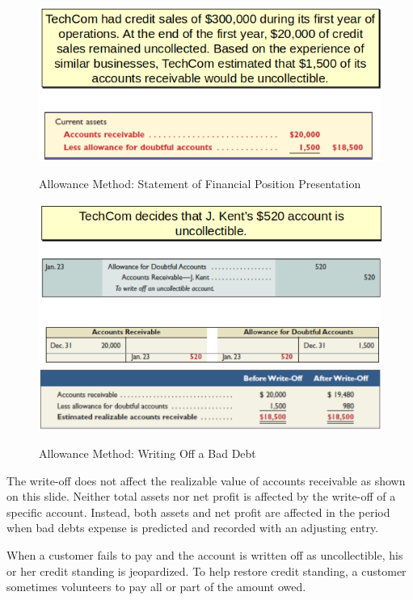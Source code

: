 \documentclass[../main.tex]{subfiles}
\begin{document}
	\begin{figure}[ht]
		\centering
		\includegraphics[width=\columnwidth]{images/c6/allowance_sfp.png}
		\caption{Allowance Method: Statement of Financial Position Presentation}
		\includegraphics[width=\columnwidth]{images/c6/allowance_writeoff.png}
		\includegraphics[width=\columnwidth]{images/c6/allowance_writeoff_result.png}
		\caption{Allowance Method: Writing Off a Bad Debt}
	\end{figure}
	
	The write-off does not affect the realizable value of accounts receivable 
	as shown on this slide. Neither total assets nor net profit is affected by 
	the write-off of a specific account. Instead, both assets and net profit 
	are affected in the period when bad debts expense is predicted and recorded 
	with an adjusting entry. 
	
	When a customer fails to pay and the account is written off as 
	uncollectible, his or her credit standing is jeopardized. To help restore 
	credit standing, a customer sometimes volunteers to pay all or part of the 
	amount owed. 
	
\end{document}
